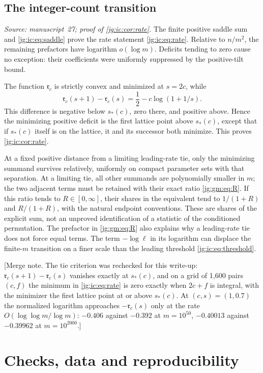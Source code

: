 \documentclass[11pt,a4paper]{article}
\theoremstyle{definition}\newaliascnt{definition}{theorem}
\theoremstyle{remark}\newaliascnt{remark}{theorem}
\begin{document}
\subsection{The integer-count transition}
\label{jg:sec:ic-transition}
\emph{Source: manuscript~27; proof of \cref{jg:ic:cor:rate}.} The finite
positive saddle sum and \eqref{jg:ic:eq:saddle} prove the rate statement
\eqref{jg:ic:eq:rate}. Relative to $n/m^2$, the remaining prefactors have
logarithm $o(\log m)$. Deficits tending to zero cause no exception: their
coefficients were uniformly suppressed by the positive-tilt bound.

The function $\mathfrak r_c$ is strictly convex and minimized at $s=2c$, while
\[
 \mathfrak r_c(s+1)-\mathfrak r_c(s)=\frac12-c\log(1+1/s).
\]
This difference is negative below $s_*(c)$, zero there, and positive above.
Hence the minimizing positive deficit is the first lattice point above
$s_*(c)$, except that if $s_*(c)$ itself is on the lattice, it and its successor
both minimize. This proves \cref{jg:ic:cor:rate}.

At a fixed positive distance from a limiting leading-rate tie, only the
minimizing summand survives relatively, uniformly on compact parameter sets with
that separation. At a limiting tie, all other summands are polynomially smaller
in $m$; the two adjacent terms must be retained with their exact ratio
\eqref{jg:gm:eq:R}. If this ratio tends to $R\in[0,\infty]$, their shares in the
equivalent tend to $1/(1+R)$ and $R/(1+R)$, with the natural endpoint
conventions. These are shares of the explicit sum, not an unproved
identification of a statistic of the conditioned permutation. The prefactor in
\eqref{jg:gm:eq:R} also explains why a leading-rate tie does not force equal
terms. The term $-\log\ell$ in its logarithm can displace the finite-$m$
transition on a finer scale than the leading threshold
\eqref{jg:ic:eq:threshold}.

[Merge note. The tie criterion was rechecked for this write-up:
$\mathfrak r_c(s+1)-\mathfrak r_c(s)$ vanishes exactly at $s_*(c)$, and on a grid
of 1,600 pairs $(c,f)$ the minimum in \eqref{jg:ic:eq:rate} is zero exactly when
$2c+f$ is integral, with the minimizer the first lattice point at or above
$s_*(c)$. At $(c,s)=(1,0.7)$ the normalized logarithm approaches $-\mathfrak
r_c(s)$ only at the rate $O(\log\log m/\log m)$: $-0.406$ against $-0.392$ at
$m=10^{50}$, $-0.40013$ against $-0.39962$ at $m=10^{2000}$.]

\section{Checks, data and reproducibility}
\label{jg:sec:checks}
\end{document}

